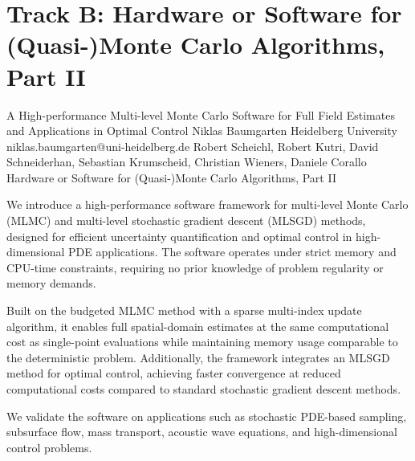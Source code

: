 \section{Track B: Hardware or Software for (Quasi-)Monte Carlo Algorithms, Part II}\newpage

\begin{talk}
{A High-performance Multi-level Monte Carlo Software for Full Field Estimates and Applications in Optimal Control}%
{Niklas Baumgarten}%
{Heidelberg University}%
{niklas.baumgarten@uni-heidelberg.de}%
{Robert Scheichl, Robert Kutri, David Schneiderhan, Sebastian Krumscheid, Christian Wieners, Daniele Corallo}%
{Hardware or Software for (Quasi-)Monte Carlo Algorithms, Part II}%


We introduce a high-performance software framework for multi-level Monte Carlo (MLMC)
and multi-level stochastic gradient descent (MLSGD) methods,
designed for efficient uncertainty quantification and optimal control in high-dimensional PDE applications.
The software operates under strict memory and CPU-time constraints,
requiring no prior knowledge of problem regularity or memory demands.

Built on the budgeted MLMC method with a sparse multi-index update algorithm,
it enables full spatial-domain estimates at the same computational cost as single-point
evaluations while maintaining memory usage comparable to the deterministic problem.
Additionally, the framework integrates an MLSGD method for optimal control,
achieving faster convergence at reduced computational costs compared to standard
stochastic gradient descent methods.

We validate the software on applications such as stochastic PDE-based sampling, subsurface flow,
mass transport, acoustic wave equations, and high-dimensional control problems.


\end{talk}

